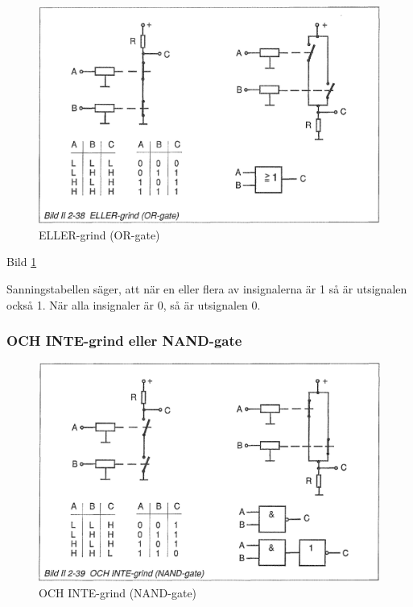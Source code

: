\begin{figure}
\includegraphics[width=\textwidth]{images/bild_2_2-38}
\caption{ELLER-grind (OR-gate)}
\label{fig:BildII2-38}
\end{figure}

Bild \ref{fig:BildII2-38}

Sanningstabellen säger, att när en eller flera av insignalerna är 1 så är
utsignalen också 1. När alla insignaler är 0, så är utsignalen 0.

\subsubsection{OCH INTE-grind eller NAND-gate}

\begin{figure}
\includegraphics[width=\textwidth]{images/bild_2_2-39}
\caption{OCH INTE-grind (NAND-gate)}
\label{fig:BildII2-39}
\end{figure}


